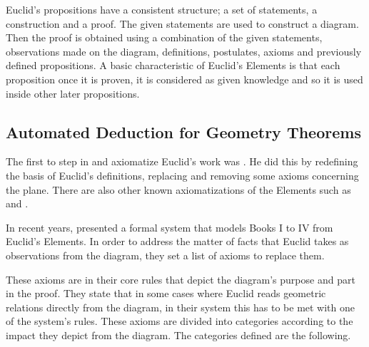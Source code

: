 \documentclass[]{interact}
\theoremstyle{plain}
\theoremstyle{definition}
\theoremstyle{remark}
\begin{document}
Euclid’s propositions have a consistent structure; a set of statements, a
construction and a proof. The given statements are used to construct a diagram.
Then the proof is obtained using a combination of the given statements,
observations made on the diagram, definitions, postulates, axioms and
previously defined propositions.
A basic characteristic of Euclid's
Elements is that each proposition once it is proven, it is considered
as given knowledge and so it is used inside other later propositions.




\subsection{Automated Deduction for Geometry Theorems}
\label{sec:atp-geometry}

The first to step in and axiomatize Euclid's work was \citet{hilbert:1899}.
He did this by redefining the basis of Euclid's definitions,
replacing and removing some axioms concerning the plane. There are
also other known axiomatizations of the Elements such as
\citet{tarski:1959} and \citet{birkhoff:1932}.

In recent years, \citet{avigad-etal:2009} presented a formal system that models
Books I to IV from Euclid's Elements. In order to address the matter
of facts that Euclid takes as observations from the diagram, they set
a list of axioms to replace them.

These axioms are in their core rules that depict
the diagram's purpose and part in the proof. They state that in some
cases where Euclid reads geometric relations directly from the
diagram, in their system this has to be met with one of the system's
rules. These axioms are divided into categories according to the
impact they depict from the diagram. The categories defined are the following.
\end{document}
